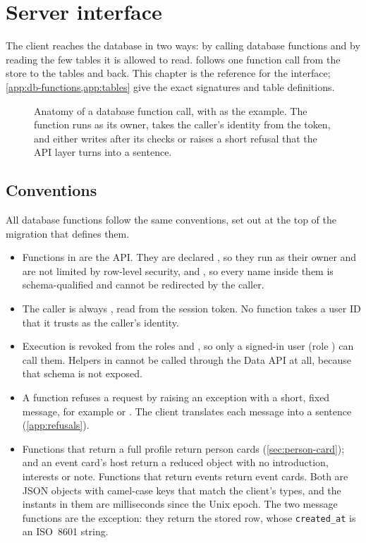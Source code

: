 \chapter{Server interface}
\label{ch:server-interface}

The client reaches the database in two ways: by calling database functions and by reading the few tables
it is allowed to read.  follows one function call from the store to the tables and
back. This chapter is the reference for the interface; \cref{app:db-functions,app:tables} give the exact
signatures and table definitions.

\begin{figure}[ht]
  \centering
  
  \caption{Anatomy of a database function call, with  as the example. The function
    runs as its owner, takes the caller's identity from the token, and either writes after its checks or
    raises a short refusal that the API layer turns into a sentence.}
  \label{fig:call-anatomy}
\end{figure}

\section{Conventions}
\label{sec:function-conventions}

All database functions follow the same conventions, set out at the top of the migration that defines
them.

\begin{itemize}
  \item Functions in  are the API. They are declared , so they run
    as their owner and are not limited by row-level security, and , so every
    name inside them is schema-qualified and cannot be redirected by the caller.
  \item The caller is always , read from the session token. No function takes a user ID
    that it trusts as the caller's identity.
  \item Execution is revoked from the roles  and , so only a signed-in user
    (role ) can call them. Helpers in  cannot be called through the
    Data API at all, because that schema is not exposed.
  \item A function refuses a request by raising an exception with a short, fixed message, for example
     or . The client translates each message into a sentence
    (\cref{app:refusals}).
  \item Functions that return a full profile return person cards (\cref{sec:person-card});
     and an event card's host return a reduced object with no introduction, interests
    or note. Functions that return events return event cards. Both are JSON objects with camel-case keys
    that match the client's types, and the instants in them are milliseconds since the Unix epoch. The
    two message functions are the exception: they return the stored  row, whose
    \texttt{created\_at} is an ISO~8601 string.
\end{itemize}

